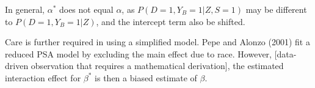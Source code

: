 \documentclass[a4paper]{article}
\begin{document}
In general, $\alpha^*$ does not equal $\alpha$, as $P(D=1,Y_B=1|Z, S=1)$ may be different to $P(D=1,Y_B=1|Z)$, and the intercept term also be shifted. 

Care is further required in using a simplified model. Pepe and Alonzo (2001) fit a reduced PSA model by excluding the main effect due to race. However, [data-driven observation that requires a mathematical derivation], the estimated interaction effect for $\beta^*$ is then a biased estimate of $\beta$.
\end{document}
